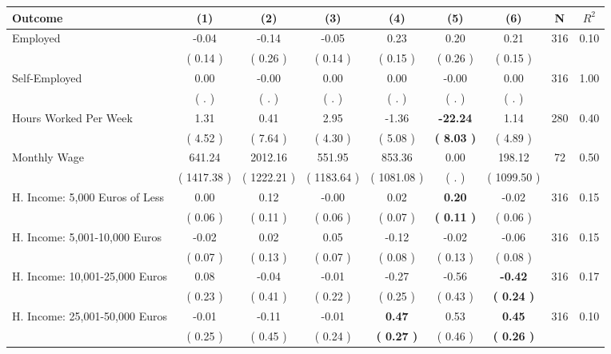 \begin{tabular}{lcccccccc}
\toprule
 \textbf{Outcome} & \textbf{(1)} & \textbf{(2)} & \textbf{(3)} & \textbf{(4)} & \textbf{(5)} & \textbf{(6)} & \textbf{N} & \textbf{$ R^2$} \\
\midrule
Employed &     -0.04 &     -0.14 &     -0.05 &      0.23 &      0.20 &      0.21 & 316 &       0.10 \\ 
 & (     0.14 ) & (     0.26 ) & (     0.14 ) & (     0.15 ) & (     0.26 ) & (     0.15 ) & \\
Self-Employed &      0.00 &     -0.00 &      0.00 &      0.00 &     -0.00 &      0.00 & 316 &       1.00 \\ 
 & (        . ) & (        . ) & (        . ) & (        . ) & (        . ) & (        . ) & \\
Hours Worked Per Week &      1.31 &      0.41 &      2.95 &     -1.36 & \textbf{   -22.24} &      1.14 & 280 &       0.40 \\ 
 & (     4.52 ) & (     7.64 ) & (     4.30 ) & (     5.08 ) & \textbf{(     8.03 )} & (     4.89 ) & \\
Monthly Wage &    641.24 &   2012.16 &    551.95 &    853.36 &      0.00 &    198.12 & 72 &       0.50 \\ 
 & (  1417.38 ) & (  1222.21 ) & (  1183.64 ) & (  1081.08 ) & (        . ) & (  1099.50 ) & \\
H. Income: 5,000 Euros of Less &      0.00 &      0.12 &     -0.00 &      0.02 & \textbf{     0.20} &     -0.02 & 316 &       0.15 \\ 
 & (     0.06 ) & (     0.11 ) & (     0.06 ) & (     0.07 ) & \textbf{(     0.11 )} & (     0.06 ) & \\
H. Income: 5,001-10,000 Euros &     -0.02 &      0.02 &      0.05 &     -0.12 &     -0.02 &     -0.06 & 316 &       0.15 \\ 
 & (     0.07 ) & (     0.13 ) & (     0.07 ) & (     0.08 ) & (     0.13 ) & (     0.08 ) & \\
H. Income: 10,001-25,000 Euros &      0.08 &     -0.04 &     -0.01 &     -0.27 &     -0.56 & \textbf{    -0.42} & 316 &       0.17 \\ 
 & (     0.23 ) & (     0.41 ) & (     0.22 ) & (     0.25 ) & (     0.43 ) & \textbf{(     0.24 )} & \\
H. Income: 25,001-50,000 Euros &     -0.01 &     -0.11 &     -0.01 & \textbf{     0.47} &      0.53 & \textbf{     0.45} & 316 &       0.10 \\ 
 & (     0.25 ) & (     0.45 ) & (     0.24 ) & \textbf{(     0.27 )} & (     0.46 ) & \textbf{(     0.26 )} & \\

\end{tabular}
